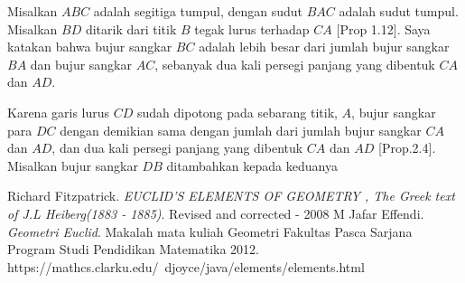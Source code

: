 \documentclass[a4paper, 12pt]{book}
\begin{document}

Misalkan $ABC$ adalah segitiga tumpul, dengan sudut $BAC$ adalah sudut tumpul.
Misalkan $BD$ ditarik dari titik $B$ tegak lurus terhadap $CA$ [Prop 1.12]. Saya
katakan bahwa bujur sangkar $BC$ adalah lebih besar dari jumlah bujur sangkar $BA$
dan bujur sangkar $AC$, sebanyak dua kali persegi panjang yang dibentuk $CA$ dan $AD$.

Karena garis lurus $CD$ sudah dipotong pada sebarang titik, $A$, bujur sangkar para $DC$
dengan demikian sama dengan jumlah dari jumlah bujur sangkar $CA$ dan $AD$, dan dua kali
persegi panjang yang dibentuk $CA$ dan $AD$ [Prop.2.4]. Misalkan bujur  sangkar $DB$
ditambahkan kepada keduanya 
\begin{thebibliography}{9}
Richard Fitzpatrick.
\textit{EUCLID’S ELEMENTS OF GEOMETRY , The Greek text of J.L Heiberg(1883 - 1885)}.
Revised and corrected - 2008 
M Jafar Effendi.
\textit{Geometri Euclid}.
Makalah mata kuliah Geometri Fakultas Pasca Sarjana Program Studi Pendidikan Matematika 2012.
https://mathcs.clarku.edu/~djoyce/java/elements/elements.html 
\end{thebibliography}
\end{document}
